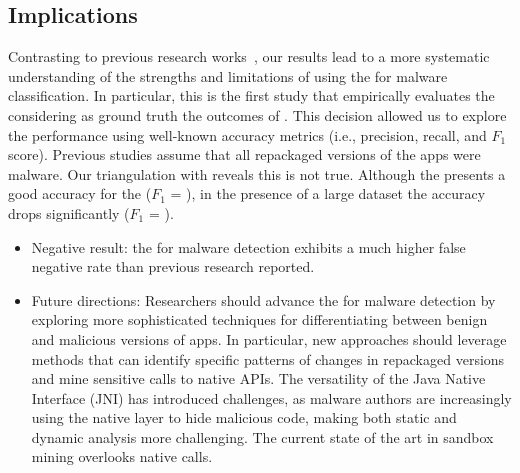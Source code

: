 \begin{comment} First, the proportion of malware samples in the
datasets differs. That is, \vt labels \review{$66.95$\%} of the repackaged version of the apps in the \cds as malware---contrasting with 67.64\% of the samples that \vt labels as malware in the \sds.
\end{comment}

\subsection{Implications}\label{sec:implications} 

Contrasting to previous research works~\cite{DBLP:conf/wcre/BaoLL18,DBLP:conf/iceccs/LeB0GL18,DBLP:journals/jss/CostaMMSSBNR22},
our results 
lead to a more systematic understanding
of the strengths and limitations of using the \mas
for malware classification. In particular, this is the
first study that empirically evaluates the \mas
considering as ground truth the outcomes
of \vt. This decision allowed us to explore the
\mas performance using well-known accuracy metrics (i.e., precision, recall, and
$F_1$ score). Previous studies assume that all repackaged versions of the
apps were malware. Our triangulation with \vt reveals this is not true. Although
the \mas presents a good accuracy for the \sds ($F_1$ = \fscoreSmall), 
in the presence of a large dataset the \mas accuracy drops significantly ($F_1$ = \fscore). 


\begin{itemize}
  \item Negative result: the \mas for malware detection exhibits a much higher false negative rate than previous research reported. 

  \item Future directions: Researchers should advance the \mas for malware detection by exploring more sophisticated techniques for differentiating between benign and malicious versions of apps. In particular, new approaches should leverage methods that can identify specific patterns of changes in repackaged versions and mine sensitive calls to native APIs. The versatility of the Java Native Interface (JNI) has introduced challenges, as malware authors are increasingly using the native layer to hide malicious code, making both static and dynamic analysis more challenging. The current state of the art in sandbox mining overlooks native calls.
  

    
\end{itemize}  


